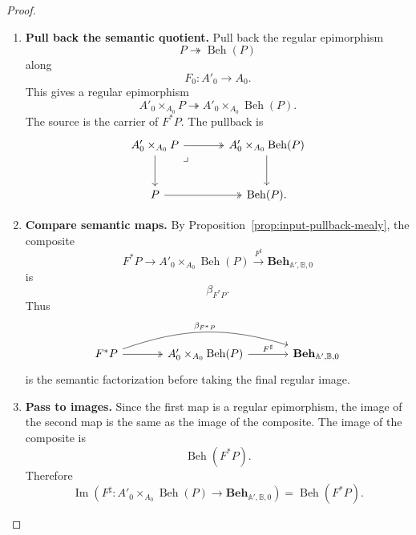 \begin{proof}
    \leavevmode
    \begin{enumerate}
        \item \textbf{Pull back the semantic quotient.}
        Pull back the regular epimorphism
        \[
            P\twoheadrightarrow\operatorname{Beh}(P)
        \]
        along
        \[
            F_0:A'_0\to A_0.
        \]
        This gives a regular epimorphism
        \[
            A'_0\times_{A_0}P
            \twoheadrightarrow
            A'_0\times_{A_0}\operatorname{Beh}(P).
        \]
        The source is the carrier of \(F^*P\). The pullback is
        \[
        \begin{tikzcd}[column sep=large, row sep=large]
            A'_0\times_{A_0}P
                \arrow[r, two heads]
                \arrow[d]
                \arrow[dr, phantom, "\lrcorner", very near start]
            &
            A'_0\times_{A_0}\operatorname{Beh}(P)
                \arrow[d]
            \\
            P
                \arrow[r, two heads]
            &
            \operatorname{Beh}(P).
        \end{tikzcd}
        \]

        \item \textbf{Compare semantic maps.}
        By Proposition~\ref{prop:input-pullback-mealy}, the composite
        \[
            F^*P
            \to
            A'_0\times_{A_0}\operatorname{Beh}(P)
            \xrightarrow{F^\sharp}
            \mathbf{Beh}_{\mathbb A',\mathbb B,0}
        \]
        is
        \[
            \beta_{F^*P}.
        \]
        Thus
        \[
        \begin{tikzcd}[column sep=large, row sep=large]
            F^*P
                \arrow[r, two heads]
                \arrow[rr, bend left=18, "\beta_{F^*P}"]
            &
            A'_0\times_{A_0}\operatorname{Beh}(P)
                \arrow[r, "F^\sharp"]
            &
            \mathbf{Beh}_{\mathbb A',\mathbb B,0}
        \end{tikzcd}
        \]
        is the semantic factorization before taking the final regular image.

        \item \textbf{Pass to images.}
        Since the first map is a regular epimorphism, the image of the second
        map is the same as the image of the composite. The image of the
        composite is
        \[
            \operatorname{Beh}(F^*P).
        \]
        Therefore
        \[
            \operatorname{Im}
            \left(
                F^\sharp:
                A'_0\times_{A_0}\operatorname{Beh}(P)
                \to
                \mathbf{Beh}_{\mathbb A',\mathbb B,0}
            \right)
            =
            \operatorname{Beh}(F^*P).
        \]
    \end{enumerate}
\end{proof}

